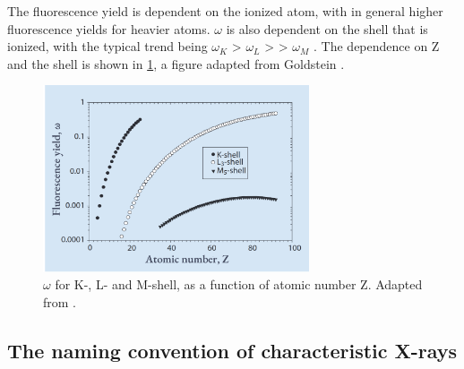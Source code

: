 The fluorescence yield is dependent on the ionized atom, with in general higher fluorescence yields for heavier atoms.
$\omega$ is also dependent on the shell that is ionized, with the typical trend being $\omega_K$ > $\omega_L$ > > $\omega_M$ \cite[p. 267]{goldstein_scanning_2018}.
The dependence on Z and the shell is shown in \cref{fig:theory:fluorescence_yield}, a figure adapted from Goldstein \cite[Fig. 4.3 (d)]{goldstein_scanning_2018}.

\begin{figure}[ht]
    \centering
    \includegraphics[width=0.7\textwidth]{figures/fluorescence_yield_Goldstein_Fig4-3-d.png}
    \caption{
        $\omega$ for K-, L- and M-shell, as a function of atomic number Z.
        Adapted from \cite[Fig. 4.3 (d)]{goldstein_scanning_2018}.
    }
    \label{fig:theory:fluorescence_yield}
\end{figure}








\subsection{The naming convention of characteristic X-rays}
\label{theory:xray_formation:naming}



